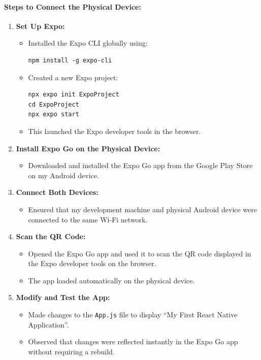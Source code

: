 \documentclass[12pt]{article}
\begin{document}
\paragraph{Steps to Connect the Physical Device:}
\begin{enumerate}
    \item \textbf{Set Up Expo:}
    \begin{itemize}
        \item Installed the Expo CLI globally using:
        \begin{verbatim}
npm install -g expo-cli
        \end{verbatim}
        \item Created a new Expo project:
        \begin{verbatim}
npx expo init ExpoProject
cd ExpoProject
npx expo start
        \end{verbatim}
        \item This launched the Expo developer tools in the browser.
    \end{itemize}
    \item \textbf{Install Expo Go on the Physical Device:}
    \begin{itemize}
        \item Downloaded and installed the Expo Go app from the Google Play Store on my Android device.
    \end{itemize}
    \item \textbf{Connect Both Devices:}
    \begin{itemize}
        \item Ensured that my development machine and physical Android device were connected to the same Wi-Fi network.
    \end{itemize}
    \item \textbf{Scan the QR Code:}
    \begin{itemize}
        \item Opened the Expo Go app and used it to scan the QR code displayed in the Expo developer tools on the browser.
        \item The app loaded automatically on the physical device.
    \end{itemize}
    \item \textbf{Modify and Test the App:}
    \begin{itemize}
        \item Made changes to the \texttt{App.js} file to display “My First React Native Application”.
        \item Observed that changes were reflected instantly in the Expo Go app without requiring a rebuild.
    \end{itemize}
\end{enumerate}
\end{document}
